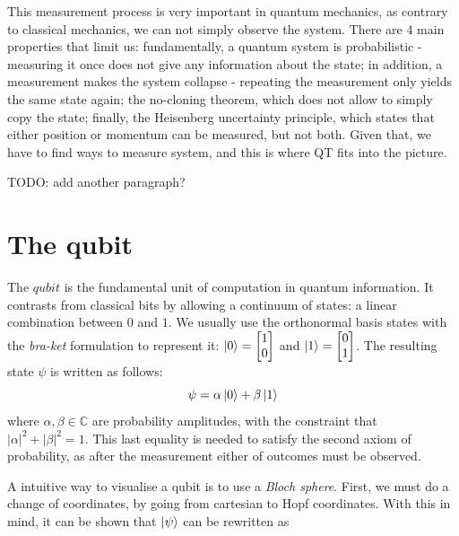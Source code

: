 \documentclass[12pt]{memoir}
\newcommand{\ti}{\textit}
\begin{document}
This measurement process is very important in quantum mechanics, as contrary to classical mechanics, we can not simply observe the system. There are 4 main properties that limit us: fundamentally, a quantum system is probabilistic - measuring it once does not give any information about the state; in addition, a measurement makes the system collapse - repeating the measurement only yields the same state again; the no-cloning theorem, which does not allow to simply copy the state; finally, the Heisenberg uncertainty principle, which states that either position or momentum can be measured, but not both. Given that, we have to find ways to measure system, and this is where QT fits into the picture.\medbreak

TODO: add another paragraph?

\section{The qubit}
The $qubit$ is the fundamental unit of computation in quantum information. It contrasts from classical bits by allowing a continuum of states: a linear combination between $0$ and $1$. We usually use the orthonormal basis states with the \textit{bra-ket} formulation to represent it: $\ket 0 = \begin{bmatrix}
    1\\
    0
\end{bmatrix}$ and $\ket 1 = \begin{bmatrix}
    0\\
    1
\end{bmatrix}$. The resulting state $\psi$ is written as follows:
\begin{equation}
    \psi = \alpha \ket 0 + \beta \ket 1 
\end{equation}
where $\alpha,\beta \in \mathbb{C}$ are probability amplitudes, with the constraint that $|\alpha|^2 + |\beta|^2 = 1$. This last equality is needed to satisfy the second axiom of probability, as after the measurement either of outcomes must be observed.\medbreak

A intuitive way to visualise a qubit is to use a \ti{Bloch sphere}. First, we must do a change of coordinates, by going from cartesian to Hopf coordinates. With this in mind, it can be shown that $\ket \psi$ can be rewritten as
\end{document}
